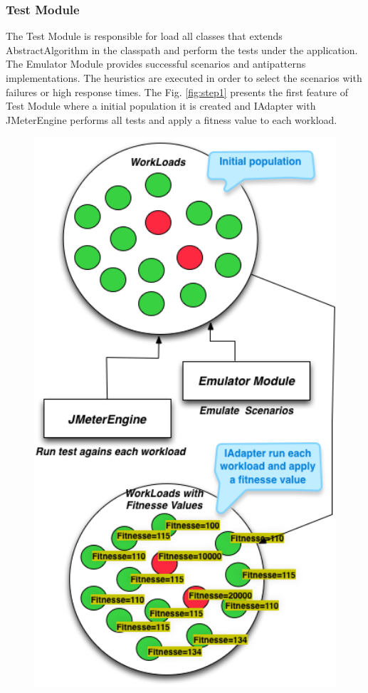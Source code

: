 \subsubsection{Test Module}

The Test Module is responsible for load all classes that extends AbstractAlgorithm in the classpath and perform the tests under the application. The Emulator Module provides successful scenarios and antipatterns implementations. The heuristics are executed in order to select the scenarios with failures or high response times. The Fig. \ref{fig:step1} presents the first feature of Test Module where a initial population it is created and IAdapter with JMeterEngine performs all tests and apply a fitness value to each workload.

\begin{figure}[h]
\begin{minipage}{.5\textwidth}
\centering
\includegraphics[width=1\textwidth]{./images/step1.png}

\end{minipage}
\end{figure}

